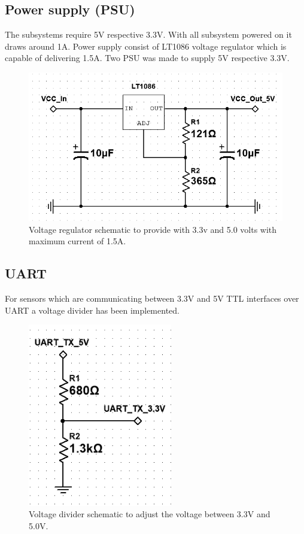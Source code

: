 \subsection{Power supply (PSU)}
The subsystems require 5V respective 3.3V. With all subsystem powered on it draws around 1A.
Power supply consist of LT1086 voltage regulator which is capable of delivering 1.5A.
Two PSU was made to supply 5V respective 3.3V.
\begin{figure}[p]
    \centering
    \includegraphics[width=\linewidth]{voltage_regulator}
    \caption{Voltage regulator schematic to provide with 3.3v and 5.0 volts with maximum current of 1.5A.}
    \label{fig:voltage_regulator}
\end{figure}



\subsection{UART}
For sensors which are communicating between 3.3V and 5V TTL interfaces over UART a voltage divider has been implemented.
\begin{figure}[p]
    \centering
    \includegraphics[height=8cm]{voltage_divider}
    \caption{Voltage divider schematic to adjust the voltage between 3.3V and 5.0V.}
    \label{fig:voltage_divider}
\end{figure}




